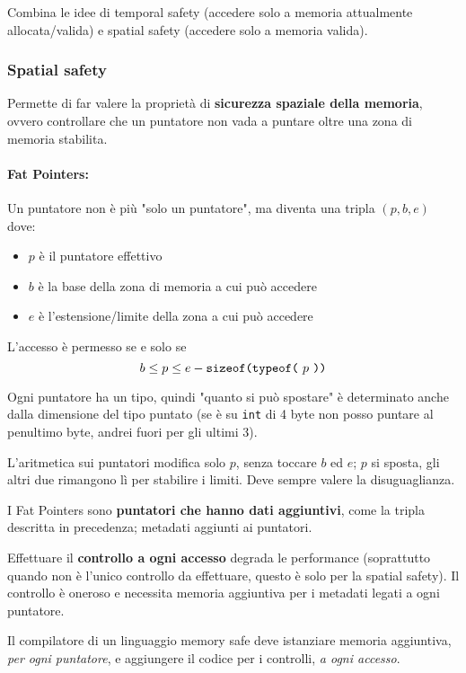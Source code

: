 Combina le idee di temporal safety (accedere solo a memoria attualmente allocata/valida) e spatial safety (accedere solo a memoria valida).

\subsubsection{Spatial safety}

Permette di far valere la proprietà di \textbf{sicurezza spaziale della memoria}, ovvero controllare che un puntatore non vada a puntare oltre una zona di memoria stabilita.

\paragraph{Fat Pointers:} Un puntatore non è più "solo un puntatore", ma diventa una tripla $(p,b,e)$ dove:
\label{par:fat-pointers}
\begin{itemize}
	\item $p$ è il puntatore effettivo
    
	\item $b$ è la base della zona di memoria a cui può accedere
	
    \item $e$ è l'estensione/limite della zona a cui può accedere
\end{itemize}

L'accesso è permesso se e solo se 
$$b \leq p \leq e - \text{\texttt{sizeof(typeof(} $p$ \text{\texttt{))}}} $$

Ogni puntatore ha un tipo, quindi "quanto si può spostare" è determinato anche dalla dimensione del tipo puntato (se è su \texttt{int} di 4 byte non posso puntare al penultimo byte, andrei fuori per gli ultimi 3). 

L'aritmetica sui puntatori modifica solo $p$, senza toccare $b$ ed $e$; $p$ si sposta, gli altri due rimangono lì per stabilire i limiti. Deve sempre valere la disuguaglianza.

I Fat Pointers sono \textbf{puntatori che hanno dati aggiuntivi}, come la tripla descritta in precedenza; metadati aggiunti ai puntatori. 

Effettuare il \textbf{controllo a ogni accesso} degrada le performance (soprattutto quando non è l'unico controllo da effettuare, questo è solo per la spatial safety). Il controllo è oneroso e necessita memoria aggiuntiva per i metadati legati a ogni puntatore.

Il compilatore di un linguaggio memory safe deve istanziare memoria aggiuntiva, \textit{per ogni puntatore}, e aggiungere il codice per i controlli, \textit{a ogni accesso}.

